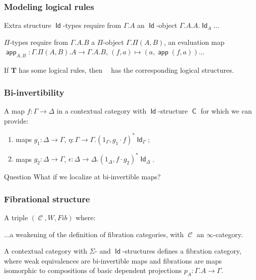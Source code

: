 \documentclass{beamer}
\DeclareMathOperator{\Id}{\mathsf{Id}}
\DeclareMathOperator{\sfC}{\mathsf{C}}
\DeclareMathOperator{\cC}{\mathcal{C}}
\DeclareMathOperator{\app}{\mathsf{app}}
\DeclareMathOperator{\Syn}{\mathsf{Syn}(\mathbf{T})}
\begin{document}
\begin{frame}
  \frametitle{Modeling logical rules}

  \begin{block}{Extra structure}
    $\Id$-types require from $\Gamma.A$ an $\Id$-object $\Gamma.A.A.\Id_A$...
    
    $\Pi$-types require from $\Gamma.A.B$ a $\Pi$-object $\Gamma.\Pi(A,B)$, an
    evaluation map $\app_{A,B}\colon\Gamma.\Pi(A,B).A\rightarrow\Gamma.A.B$,
    $(f,a)\mapsto(a,\app(f,a))$...
  \end{block}
  \pause

  \begin{example}
    If $\mathbf{T}$ has some logical rules, then $\Syn$ has the corresponding
    logical structures.
  \end{example}
\end{frame}

\begin{frame}
  \frametitle{Bi-invertibility}

  \begin{defn}
    A map $f\colon\Gamma\rightarrow\Delta$ in a contextual category with
    $\Id$-structure $\sfC$ for which we can provide:
    \begin{enumerate}
      \item maps $g_1\colon\Delta\rightarrow\Gamma$,
        $\eta\colon\Gamma\rightarrow\Gamma.(1_\Gamma,g_1\cdot f)^*\Id_\Gamma$;
      \item maps $g_2\colon\Delta\rightarrow\Gamma$,
        $\epsilon\colon\Delta\rightarrow\Delta.(1_\Delta,f\cdot g_2)^*\Id_\Delta$.
    \end{enumerate}
  \end{defn}
  \pause

  \begin{block}{Question}
    What if we localize at bi-invertible maps?
  \end{block}
\end{frame}

\begin{frame}
  \frametitle{Fibrational structure}
  
  \begin{defn}
    A triple $(\cC,W,Fib)$ where:

    ...a weakening of the definition of fibration categories, with $\cC$ an
    $\infty$-category.
  \end{defn}
  \pause

  \begin{thm}
    A contextual category with $\Sigma$- and $\Id$-structures defines a
    fibration category, where weak equivalences are bi-invertible maps and
    fibrations are maps isomorphic to  compositions of basic dependent
    projections $p_A\colon\Gamma.A\rightarrow\Gamma$.
  \end{thm}
\end{frame}
\end{document}
